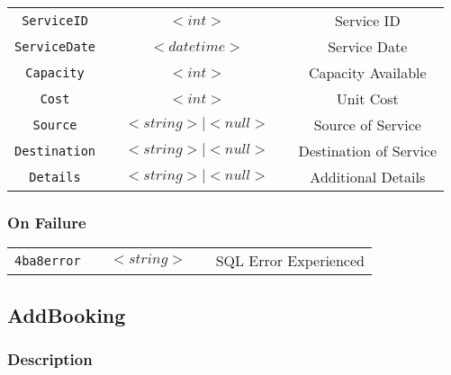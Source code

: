 \begin{tabular}{ccccc}
\verb!ServiceID! & \vspace{15mm} & $<int>$ & \vspace{15mm} & Service ID \\
\verb!ServiceDate! & \vspace{15mm} & $<datetime>$ & \vspace{15mm} & Service Date \\
\verb!Capacity! & \vspace{15mm} & $<int>$ & \vspace{15mm} & Capacity Available \\
\verb!Cost! & \vspace{15mm} & $<int>$ & \vspace{15mm} & Unit Cost \\
\verb!Source! & \vspace{15mm} & $<string> \mid <null>$ & \vspace{15mm} & Source of Service \\
\verb!Destination! & \vspace{15mm} & $<string> \mid  <null>$ & \vspace{15mm} & Destination of Service \\
\verb!Details! & \vspace{15mm} & $<string> \mid <null>$ & \vspace{15mm} & Additional Details \\
\end{tabular}
\subsubsection{On Failure}

\begin{tabular}{ccccc}
\verb!4ba8error! & \vspace{15mm} & $<string>$ & \vspace{15mm} & SQL Error Experienced \\
\end{tabular}


\subsection{AddBooking}

\subsubsection{Description}

